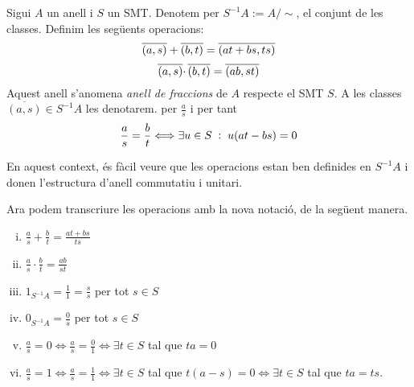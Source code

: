 \documentclass[../../../main.tex]{subfiles}
\begin{document}
\begin{defi}
\label{def:anellDeFraccions} Sigui $A$ un anell i $S$ un SMT. Denotem per $S^{-1}A:=A/\sim$, el conjunt de les classes. Definim les següents operacions:
\begin{equation}
    \notag
    \overline{(a,s)}+\overline{(b,t)} = \overline{(at+bs,ts)}
\end{equation}
\begin{equation}
    \notag
    \overline{(a,s)}\cdotp\overline{(b,t)} = \overline{(ab,st)}
\end{equation}
Aquest anell s'anomena \textit{anell de fraccions} de $A$ respecte el SMT $S$. A les classes $\overline{(a,s)}\in S^{-1}A$ les denotarem. per $\frac{a}{s}$ i per tant
\begin{equation}
    \notag
    \frac{a}{s} = \frac{b}{t}\Longleftrightarrow \exists u\in S\;:\;u(at-bs) = 0
\end{equation}
\end{defi}

En aquest context, és fàcil veure que les operacions estan ben definides en $S^{-1}A$ i donen l'estructura d'anell commutatiu i unitari.

\begin{nota}
\label{nota:operacionsEnAnellFraccions} Ara podem transcriure les operacions amb la nova notació, de la següent manera.
\begin{multicols}{2}
\begin{enumerate}[(i)]
    \item $\frac{a}{s}+\frac{b}{t} = \frac{at+bs}{ts}$
    \item $\frac{a}{s}\cdotp\frac{b}{t} = \frac{ab}{st}$
    \item $1_{S^{-1}A} = \frac{1}{1} = \frac{s}{s}$ per tot $s\in S$
    \item $0_{S^{-1}A} = \frac{0}{s}$ per tot $s\in S$
    \item $\frac{a}{s} = 0\Longleftrightarrow \frac{a}{s} = \frac{0}{1}\Longleftrightarrow \exists t\in S$ tal que $ta=0$
    \item $\frac{a}{s}=1\Longleftrightarrow \frac{a}{s}=\frac{1}{1}\Longleftrightarrow \exists t\in S$ tal que $t(a-s) = 0\Longleftrightarrow \exists t\in S$ tal que $ta=ts$.
\end{enumerate}
\end{multicols}
\end{nota}
\end{document}
